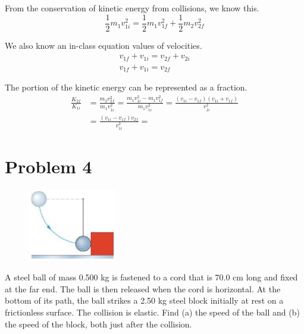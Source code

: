 \documentclass[12pt]{article}
\begin{document}
From the conservation of kinetic energy from collisions, we know this.
\begin{equation}
    \frac{1}{2}m_1v_{1i}^2 = \frac{1}{2}m_1v_{1f}^2 + \frac{1}{2}m_2v_{2f}^2
\end{equation}

We also know an in-class equation values of velocities.
\begin{gather}
    v_{1f} + v_{1i} = v_{2f} + v_{2i}\\
    v_{1f} + v_{1i} = v_{2f}
\end{gather}

The portion of the kinetic energy can be represented as a fraction.
\begin{align}
    \frac{K_{2f}}{K_{1i}}   &=  \frac{m_2v_{2f}^2}{m_1v_{1i}^2}
        =   \frac{m_1v_{1i}^2 - m_1v_{1f}^2}{m_1v_{1i}^2}
        =   \frac{(v_{1i} - v_{1f})(v_{1i} + v_{1f})}{v_{1i}^2}\\
        &=  \frac{(v_{1i} - v_{1f})v_{2f}}{v_{1i}^2}
        =   
\end{align}


\pagebreak
\section*{Problem 4}
\begin{figure}
    \vspace{-30pt}
    \includegraphics[width=0.35\textwidth]{graph_4.png} 
\end{figure}
A steel ball of mass 0.500 kg is fastened to a cord that is 70.0 cm long and fixed at the far end. The
ball is then released when the cord is horizontal. At the bottom of its path, the ball strikes a 2.50 kg steel
block initially at rest on a frictionless surface. The collision is elastic. Find (a) the speed of the ball and
(b) the speed of the block, both just after the collision.
\end{document}
